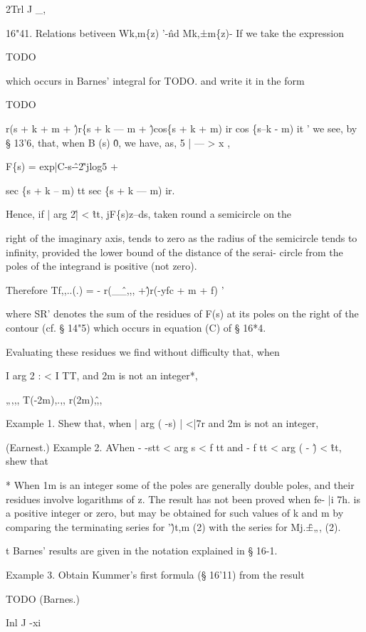 2Trl J \_,

16"41. Relations betiveen Wk,m\{z) '-\^nd Mk,±m\{z)- If we take the
expression

TODO

which occurs in Barnes' integral for TODO. and write it in the form

TODO

r(s + k + m + \^)r\{s + k — m + \^)cos\{s + k + m) ir cos \{s--k - m)
it ' we see, by § 13'6, that, when B (s) \^ 0, we have, as, 5 | — > x
,

F\{s) = exp|C-s-\^-2\^'jlog5 +

sec \{s + k -- m) tt sec \{s + k — m) ir.

Hence, if | arg 2\^ | < \^ tt, jF\{s)z--ds, taken round a semicircle
on the

right of the imaginary axis, tends to zero as the radius of the
semicircle tends to infinity, provided the lower bound of the distance
of the serai- circle from the poles of the integrand is positive (not
zero).

Therefore Tf,,..(.) = - r(\_\^\_,,, +\^)r(-yfc + m + f) '

where SR' denotes the sum of the residues of F(s) at its poles on the
right of the contour (cf. § 14"5) which occurs in equation (C) of §
16*4.

Evaluating these residues we find without difficulty that, when

I arg 2 : < I TT, and 2m is not an integer*,

„,,, T(-2m),.,, r(2m),\^,,

Example 1. Shew that, when | arg ( -s) | <|7r and 2m is not an
integer,

(Earnest.) Example 2. AVhen - -stt < arg s < f tt and - f tt < arg ( -
\^) < \^tt, shew that

* When 1m is an integer some of the poles are generally double poles,
and their residues involve logarithms of z. The result has not been
proved when fe- |i 7h. is a positive integer or zero, but may be
obtained for such values of k and m by comparing the terminating
series for '\^)t,m (2) with the series for Mj.\^±„, (2).

t Barnes' results are given in the notation explained in § 16-1.

%
%

Example 3. Obtain Kummer's first formula (§ 16'11) from the result

TODO (Barnes.)

Inl J -xi

